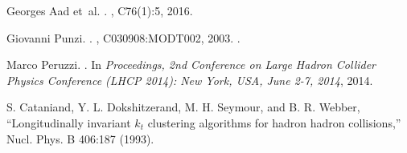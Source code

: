 \begin{thebibliography}{99}
Georges Aad et~al.
.
, C76(1):5, 2016.




Giovanni Punzi.
.
, C030908:MODT002, 2003.
\newblock [,79(2003)].


Marco Peruzzi.
.
\newblock In {\em {Proceedings, 2nd Conference on Large Hadron Collider Physics
  Conference (LHCP 2014): New York, USA, June 2-7, 2014}}, 2014.



 S. Cataniand, Y. L. Dokshitzerand, M. H. Seymour, and B. R. Webber, ``Longitudinally
invariant $k_{t}$ clustering algorithms for hadron hadron collisions,'' Nucl. Phys. B 406:187 (1993).

\end{thebibliography}
